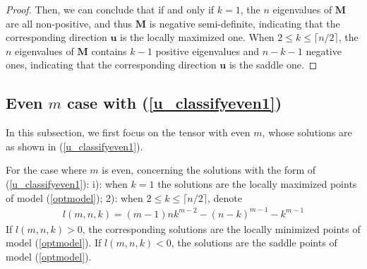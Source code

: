 \begin{proof}
 Then, we can conclude that    
 if and only if  $k=1$,  the  $n$  eigenvalues  of  $\mathbf M$  are all  non-positive, and thus  $\mathbf M$   is  negative  semi-definite,  indicating  that  the corresponding  direction  $\mathbf u $  is  the  locally maximized    one. 
 When  $2 \le  k \le \lceil n/2  \rceil $,  the  $n$  eigenvalues  of  $\mathbf M$  
 contains 
 $k-1$   positive  eigenvalues 
 and  
  $n- k-1$  negative  ones,  indicating  that  the corresponding  direction  $\mathbf u $  is  the  saddle  one. 
\end{proof}
	
	
 \subsection{Even   $m$ case with (\ref{u_classifyeven1}) }\label{evencase1}
  In this subsection, we first 
 focus on the tensor with  even   $m$,
 whose solutions 
 are as shown in 
 (\ref{u_classifyeven1}). 
 \begin{lemma}\label{Theorem_structureoflocaleven1}
 	For the case where   $m$ is even,  concerning  the solutions 
 with the form of  (\ref{u_classifyeven1}):
 i):
 	when  $k=1$ 
 	the solutions  are   the  locally maximized    points  of    model (\ref{optmodel});
 	2):  	when  $2 \le  k \le \lceil n/2  \rceil $, denote 
 	\begin{align}
 	l(m,n,k)
 	=
 	(m-1)nk^{m-2} - (n-k)^{m-1}- k^{m-1}
 	\end{align}
 If  $ l(m,n,k) >0$, 
 the  corresponding  solutions  are   the  locally minimized    points  of    model (\ref{optmodel}).
 If 
 $ l(m,n,k) < 0$, 
 the    solutions  are   the  saddle    points  of    model (\ref{optmodel}).

 \end{lemma}

